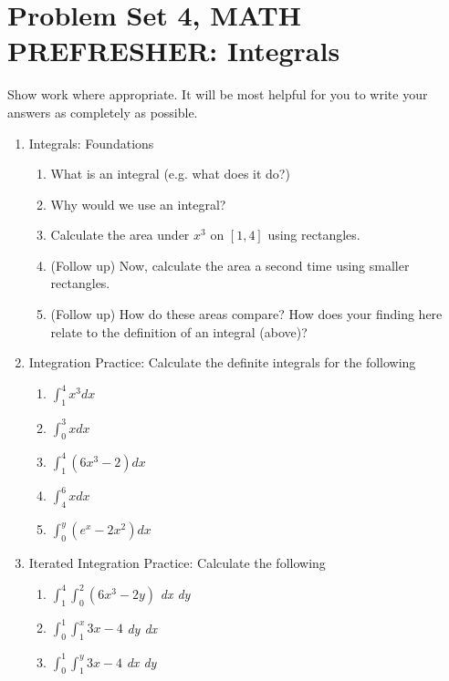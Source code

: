 \documentclass[11pt]{article}
\begin{document}
\section*{Problem Set 4, MATH PREFRESHER: Integrals }
Show work where appropriate. It will be most helpful for you to write your answers as completely as possible.

\begin{enumerate}
\item Integrals: Foundations
\begin{enumerate}

\item What is an integral (e.g. what does it do?)
\item Why would we use an integral?
\item Calculate the area under $x^3$ on $[1,4]$ using rectangles. 
\item (Follow up) Now, calculate the area a second time using smaller rectangles. 
\item (Follow up) How do these areas compare? How does your finding here relate to the definition of an integral (above)?
\end{enumerate}


\item Integration Practice: Calculate the definite integrals for the following
\begin{enumerate}
\item $\int_1^4 x^3 dx$
\item $\int_0^3 x dx$
\item $\int_1^4 (6x^3-2) dx$
\item $\int_4^6 x dx$
\item $\int_0^y (e^x-2x^2)dx$
\end{enumerate}


\item Iterated Integration Practice: Calculate the  following
\begin{enumerate}
\item $\int_1^4  \int_0^2 (6x^3-2y)$ \textit{dx dy}
\item $\int_0^1 \int_1^x 3x-4$ \textit{dy dx}
\item $\int_0^1 \int_1^y 3x-4$ \textit{dx dy}
\end{enumerate}

\end{enumerate}
\end{document}
